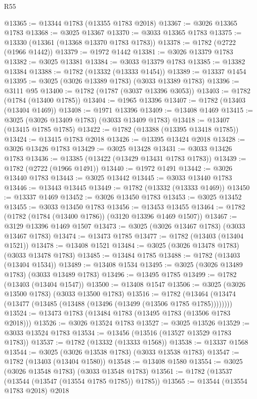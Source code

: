 \begin{lexlean}{R55}
\begin{coremodule}
@13365 := @13344 @1783 (@13355 @1783 @2018)
@13367 := @3026 @13365 @1783
@13368 := @3025 @13367
@13370 := @3033 @13365 @1783
@13375 := @13330 (@13361 (@13368 @13370 @1783 @1783))
@13378 := @1782 (@2722 (@1966 @1442))
@13379 := @1972 @1442
@13381 := @3026 @13379 @1783
@13382 := @3025 @13381
@13384 := @3033 @13379 @1783
@13385 := @13382 @13384
@13388 := @1782 (@13332 (@13333 @1454))
@13389 := @13337 @1454
@13395 := @3025 (@3026 @13389 @1783) (@3033 @13389 @1783)
@13396 := @3111 @95
@13400 := @1782 (@1787 (@3037 @13396 @3053))
@13403 := @1782 (@1784 (@13400 @1785))
@13404 := @1965 @13396
@13407 := @1782 (@13403 (@13404 @1469))
@13408 := @1971 @13396
@13409 := @13408 @1469
@13415 := @3025 (@3026 @13409 @1783) (@3033 @13409 @1783)
@13418 := @13407 (@13415 @1785 @1785)
@13422 := @1782 (@13388 (@13395 @13418 @1785))
@13424 := @13415 @1783 @2018
@13426 := @13395 @13424 @2018
@13428 := @3026 @13426 @1783
@13429 := @3025 @13428
@13431 := @3033 @13426 @1783
@13436 := @13385 (@13422 (@13429 @13431 @1783 @1783))
@13439 := @1782 (@2722 (@1966 @1491))
@13440 := @1972 @1491
@13442 := @3026 @13440 @1783
@13443 := @3025 @13442
@13445 := @3033 @13440 @1783
@13446 := @13443 @13445
@13449 := @1782 (@13332 (@13333 @1469))
@13450 := @13337 @1469
@13452 := @3026 @13450 @1783
@13453 := @3025 @13452
@13455 := @3033 @13450 @1783
@13456 := @13453 @13455
@13464 := @1782 (@1782 (@1784 (@13400 @1786)) (@3120 @13396 @1469 @1507))
@13467 := @3129 @13396 @1469 @1507
@13473 := @3025 (@3026 @13467 @1783) (@3033 @13467 @1783)
@13474 := @13473 @1785
@13477 := @1782 (@13403 (@13404 @1521))
@13478 := @13408 @1521
@13484 := @3025 (@3026 @13478 @1783) (@3033 @13478 @1783)
@13485 := @13484 @1785
@13488 := @1782 (@13403 (@13404 @1534))
@13489 := @13408 @1534
@13495 := @3025 (@3026 @13489 @1783) (@3033 @13489 @1783)
@13496 := @13495 @1785
@13499 := @1782 (@13403 (@13404 @1547))
@13500 := @13408 @1547
@13506 := @3025 (@3026 @13500 @1783) (@3033 @13500 @1783)
@13516 := @1782 (@13464 (@13474 (@13477 (@13485 (@13488 (@13496 (@13499 (@13506 @1785 @1785))))))))
@13524 := @13473 @1783 (@13484 @1783 (@13495 @1783 (@13506 @1783 @2018)))
@13526 := @3026 @13524 @1783
@13527 := @3025 @13526
@13529 := @3033 @13524 @1783
@13534 := @13456 (@13516 (@13527 @13529 @1783 @1783))
@13537 := @1782 (@13332 (@13333 @1568))
@13538 := @13337 @1568
@13544 := @3025 (@3026 @13538 @1783) (@3033 @13538 @1783)
@13547 := @1782 (@13403 (@13404 @1580))
@13548 := @13408 @1580
@13554 := @3025 (@3026 @13548 @1783) (@3033 @13548 @1783)
@13561 := @1782 (@13537 (@13544 (@13547 (@13554 @1785 @1785)) @1785))
@13565 := @13544 (@13554 @1783 @2018) @2018

\end{coremodule}
\end{lexlean}
